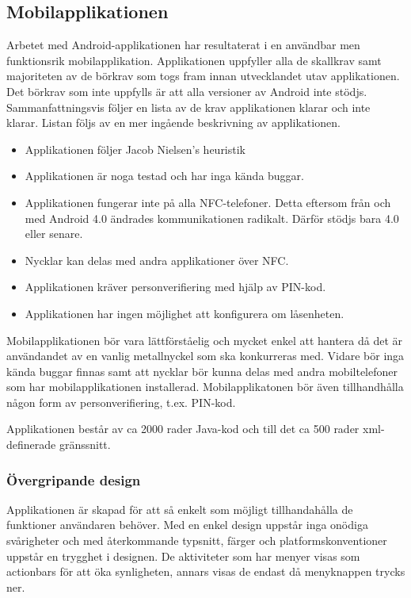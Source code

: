 \documentclass[11pt]{article}
\begin{document}
\subsection{Mobilapplikationen}
Arbetet med Android-applikationen har resultaterat i en användbar men funktionsrik mobilapplikation. Applikationen uppfyller alla de skallkrav samt majoriteten av de börkrav som togs fram innan utvecklandet utav applikationen. Det börkrav som inte uppfylls är att alla versioner av Android inte stödjs. Sammanfattningsvis följer en lista av de krav applikationen klarar och inte klarar. Listan följs av en mer ingående beskrivning av applikationen.
\begin{itemize}
\item Applikationen följer Jacob Nielsen’s heuristik
\item Applikationen är noga testad och har inga kända buggar.
\item Applikationen fungerar inte på alla NFC-telefoner. Detta eftersom från och med Android 4.0 ändrades kommunikationen radikalt. Därför stödjs bara 4.0 eller senare.
\item Nycklar kan delas med andra applikationer över NFC.
\item Applikationen kräver personverifiering med hjälp av PIN-kod.
\item Applikationen har ingen möjlighet att konfigurera om låsenheten.
\end{itemize}

Mobilapplikationen bör vara lättförståelig och mycket enkel att hantera då det är användandet av en vanlig metallnyckel som ska konkurreras med. Vidare bör inga kända buggar finnas samt att nycklar bör kunna delas med andra mobiltelefoner som har mobilapplikationen installerad. Mobilapplikatonen bör även tillhandhålla någon form av personverifiering, t.ex. PIN-kod.

Applikationen består av ca 2000 rader Java-kod och till det ca 500 rader xml-definerade gränssnitt.

\subsubsection{Övergripande design}
Applikationen är skapad för att så enkelt som möjligt tillhandahålla de funktioner användaren behöver. Med en enkel design uppstår inga onödiga svårigheter och med återkommande typsnitt, färger och platformskonventioner uppstår en trygghet i designen. De aktiviteter som har menyer visas som actionbars för att öka synligheten, annars visas de endast då menyknappen trycks ner.
\end{document}
